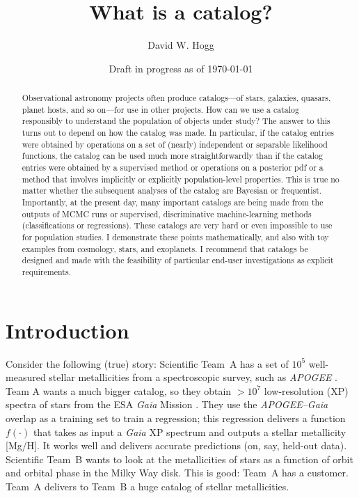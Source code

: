 \documentclass[10pt]{article}
\title{\textbf{What is a catalog?}}
\author{David W. Hogg}
\date{Draft in progress as of \today}
\begin{document}
\maketitle\thispagestyle{empty}

\begin{abstract}\noindent
    Observational astronomy projects often produce catalogs---of stars, galaxies, quasars, planet hosts, and so on---for use in other projects.
    How can we use a catalog responsibly to understand the population of objects under study?
    The answer to this turns out to depend on how the catalog was made.
    In particular, if the catalog entries were obtained by operations on a set of (nearly) independent or separable likelihood functions, the catalog can be used much more straightforwardly than if the catalog entries were obtained by a supervised method or operations on a posterior pdf or a method that involves implicitly or explicitly population-level properties.
    This is true no matter whether the subsequent analyses of the catalog are Bayesian or frequentist.
    Importantly, at the present day, many important catalogs are being made from the outputs of MCMC runs or supervised, discriminative machine-learning methods (classifications or regressions).
    These catalogs are very hard or even impossible to use for population studies.
    I demonstrate these points mathematically, and also with toy examples from cosmology, stars, and exoplanets.
    I recommend that catalogs be designed and made with the feasibility of particular end-user investigations as explicit requirements.
\end{abstract}

\section{Introduction}

Consider the following (true) story:
Scientific Team~A has a set of $10^5$ well-measured stellar metallicities from a spectroscopic survey, such as \textsl{APOGEE} \cite{apogee}.
Team A wants a much bigger catalog, so they obtain $>10^7$ low-resolution (XP) spectra of stars from the ESA \textsl{Gaia} Mission \cite{gaiadr3}.
They use the \textsl{APOGEE--Gaia} overlap as a training set to train a regression; this regression delivers a function $f(\cdot)$ that takes as input a \textsl{Gaia} XP spectrum and outputs a stellar metallicity [Mg/H].
It works well and delivers accurate predictions (on, say, held-out data).
Scientific Team~B wants to look at the metallicities of stars as a function of orbit and orbital phase in the Milky Way disk.
This is good: Team~A has a customer.
Team~A delivers to Team~B a huge catalog of stellar metallicities.
\end{document}
